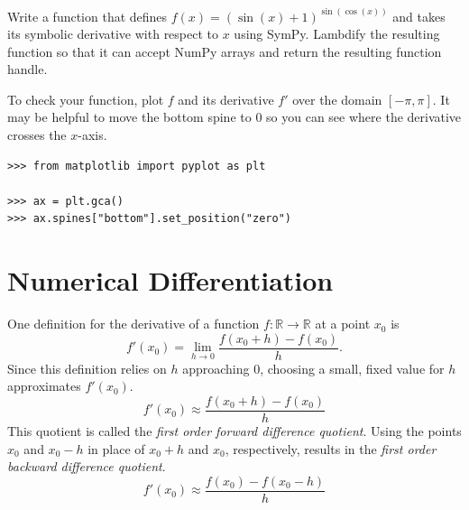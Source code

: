 \begin{problem}
Write a function that defines $f(x) = (\sin(x) + 1)^{\sin(\cos(x))}$ and takes its symbolic derivative with respect to $x$ using SymPy.
Lambdify the resulting function so that it can accept NumPy arrays and return the resulting function handle.

To check your function, plot $f$ and its derivative $f'$ over the domain $[-\pi, \pi]$.
It may be helpful to move the bottom spine to $0$ so you can see where the derivative crosses the $x$-axis.
\begin{lstlisting}
>>> from matplotlib import pyplot as plt

>>> ax = plt.gca()
>>> ax.spines["bottom"].set_position("zero")
\end{lstlisting}
\label{prob:sympy-symbolic-diff}
\end{problem}

\section*{Numerical Differentiation} %


One definition for the derivative of a function $f:\mathbb{R}\rightarrow\mathbb{R}$ at a point $x_0$ is
\[
f'(x_0) = \lim_{h\rightarrow 0} \frac{f(x_0 + h)-f(x_0)}{h}.
\]
Since this definition relies on $h$ approaching $0$, choosing a small, fixed value for $h$ approximates $f'(x_0)$.
\begin{equation}
f'(x_0) \approx \frac{f(x_0+h) - f(x_0)}{h}
\label{eq:first-order-forward-difference}
\end{equation}
This quotient is called the \emph{first order forward difference quotient}.
Using the points $x_0$ and $x_0-h$ in place of $x_0+h$ and $x_0$, respectively, results in the \emph{first order backward difference quotient}.
\begin{equation}
f'(x_0) \approx \frac{f(x_0) - f(x_0-h)}{h}
\label{eq:first-order-backward-difference}
\end{equation}

